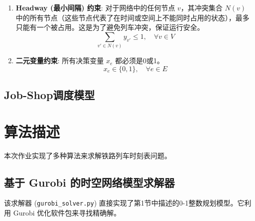 \documentclass{article}
\begin{document}
\begin{enumerate}
    \item \textbf{Headway (最小间隔) 约束}:
        对于网络中的任何节点 $v$，其冲突集合 $N(v)$
        中的所有节点（这些节点代表了在时间或空间上不能同时占用的状态），最多只能有一个被占用。这是为了避免列车冲突，保证运行安全。
        \begin{equation}
            \sum_{v' \in N(v)} y_{v'} \le 1, \quad \forall v \in
            V\label{eq:con_headway}
        \end{equation}

    \item \textbf{二元变量约束}:
        所有决策变量 $x_e$ 都必须是0或1。
        \begin{equation}
            x_e \in \{0,1\}, \quad \forall e \in E\label{eq:con_binary}
        \end{equation}
\end{enumerate}

\subsection{Job-Shop调度模型}


\section{算法描述}
\label{sec:algo_desc}
本次作业实现了多种算法来求解铁路列车时刻表问题。

\subsection{基于 Gurobi 的时空网络模型求解器}
该求解器 (\texttt{gurobi\_solver.py}) 直接实现了第1节中描述的0-1整数规划模型。它利用 Gurobi 优化软件包来寻找精确解。
\end{document}
